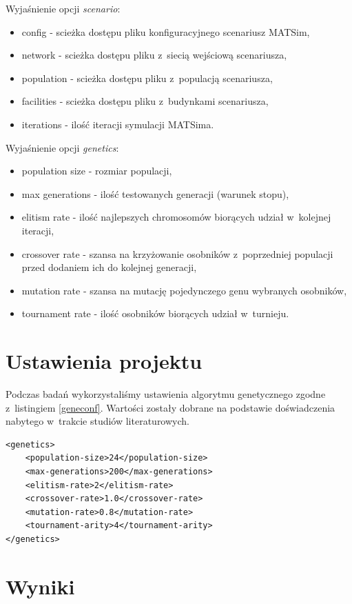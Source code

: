 \documentclass[twoside,12pt]{report}
\begin{document}
Wyjaśnienie opcji \textit{scenario}:
\begin{itemize}
\item config - scieżka dostępu pliku konfiguracyjnego scenariusz MATSim,
\item network - scieżka dostępu pliku z~siecią wejściową scenariusza,
\item population - scieżka dostępu pliku z~populacją scenariusza,
\item facilities - scieżka dostępu pliku z~budynkami scenariusza,
\item iterations - ilość iteracji symulacji MATSima.
\end{itemize}

Wyjaśnienie opcji \textit{genetics}:
\begin{itemize}
\item population size - rozmiar populacji,
\item max generations - ilość testowanych generacji (warunek stopu),
\item elitism rate - ilość najlepszych chromosomów biorących udział w~kolejnej iteracji,
\item crossover rate - szansa na krzyżowanie osobników z~poprzedniej populacji przed dodaniem ich do kolejnej generacji,
\item mutation rate - szansa na mutację pojedynczego genu wybranych osobników,
\item tournament rate - ilość osobników biorących udział w~turnieju.
\end{itemize}




\section{Ustawienia projektu}

Podczas badań wykorzystaliśmy ustawienia algorytmu genetycznego zgodne z~listingiem \ref{geneconf}. Wartości zostały dobrane na podstawie doświadczenia nabytego w~trakcie studiów literaturowych. 
	
\begin{lstlisting}[caption=Ustawienia algorytmu genetycznego podczas badań]
<genetics>
	<population-size>24</population-size>
	<max-generations>200</max-generations>
	<elitism-rate>2</elitism-rate>
	<crossover-rate>1.0</crossover-rate>
	<mutation-rate>0.8</mutation-rate>
	<tournament-arity>4</tournament-arity>
</genetics>
\end{lstlisting}

\clearpage
\section{Wyniki}
\end{document}

